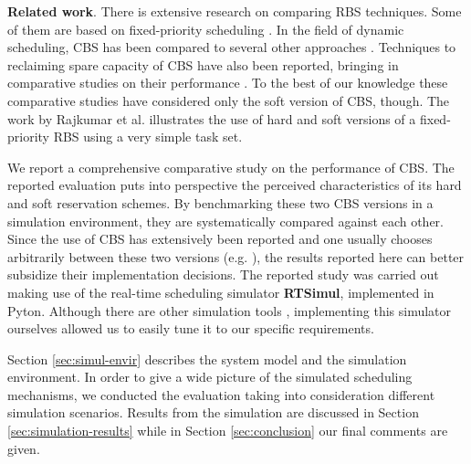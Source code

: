 \documentclass[times, 10pt,twocolumn]{article}
\newcommand{\simul}{\textbf{RTSimul}} %
\begin{document}
\textbf{Related work}. There is extensive research on comparing RBS
techniques.  Some of them are based on fixed-priority scheduling
\cite{bernat.ea99:new,bernat.ea02:multiple,davis.ea05:hierarchical,davis.ea95:dual}.
In the field of dynamic scheduling, CBS has been compared to several
other approaches \cite{spuri.ea96:scheduling}.  Techniques to
reclaiming spare capacity of CBS have also been reported, bringing in
comparative studies on their performance
\cite{caccamo.ea00:capacity,lin.ea05:improving}. To the best of our
knowledge these comparative studies have considered only the soft
version of CBS, though.  The work by Rajkumar et
al. \cite{rajkumar.ea01:resource} illustrates the use of hard and soft
versions of a fixed-priority RBS using a very simple task set.

\label{sec:contr-this-paper}

We report a comprehensive comparative study on the performance of
CBS. The reported evaluation puts into perspective the perceived
characteristics of its hard and soft reservation schemes.  By
benchmarking these two CBS versions in a simulation environment, they
are systematically compared against each other.  Since the use of CBS
has extensively been reported and one usually chooses arbitrarily
between these two versions
(e.g. \cite{abeni.ea99:adaptive,abeni.ea05:qos}), the results reported
here can better subsidize their implementation decisions.  The
reported study was carried out making use of the real-time scheduling
simulator \simul{}, implemented in Pyton. Although there are other
simulation tools \cite{ancilotti.ea96:flexible}, implementing this
simulator ourselves allowed us to easily tune it to our specific
requirements.

\label{sec:structure-this-paper}

Section \ref{sec:simul-envir} describes the system model and the
simulation environment.  In order to give a wide picture of the
simulated scheduling mechanisms, we conducted the evaluation taking
into consideration different simulation scenarios. Results from the
simulation are discussed in Section \ref{sec:simulation-results} while
in Section \ref{sec:conclusion} our final comments are given.

\label{sec:simul-envir}
\end{document}
